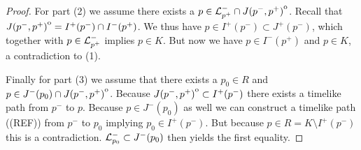 \begin{proof}

For part (2) we assume there exists a $p\in {\mathcal{L}}^-_{p^+}\cap {\kern0ptJ(p^-,p^+)}^{\mathrm{o}}$. Recall that ${\kern0ptJ(p^-,p^+)}^{\mathrm{o}}=I^+(p^-)\cap I^-(p^+)$. We thus have $p\in I^+(p^-)\subset J^+(p^-)$, which together with $p\in {\mathcal{L}}^-_{p^+}$ implies $p\in K$. But now we have $p\in I^-(p^+)$ and $p\in K$, a contradiction to (1).

Finally for part (3) we assume that there exists a $p_0\in R$ and $p\in J^-(p_0)\cap {\kern0ptJ(p^-,p^+)}^{\mathrm{o}}$. Because ${\kern0ptJ(p^-,p^+)}^{\mathrm{o}}\subset I^+(p^-)$ there exists a timelike path from $p^-$ to $p$. Because $p\in J^-(p_0)$ as well we can construct a timelike path ((REF)) from $p^-$ to $p_0$ implying $p_0\in I^+(p^-)$. But because $p\in R=K\setminus I^+(p^-)$ this is a contradiction. ${\mathcal{L}}^-_{p_0} \subset J^-(p_0)$ then yields the first equality.
\end{proof}



